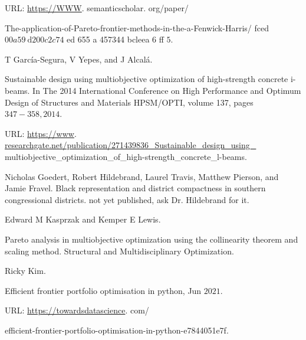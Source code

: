 URL: \href{https://WWW}{https://WWW}. semanticscholar. org/paper/

The-application-of-Pareto-frontier-methods-in-the-a-Fenwick-Harris/ fced $00 a 59 \mathrm{~d} 200 c 2 c 74$ ed 655 a 457344 bcleea 6 ff $5 .$

T García-Segura, V Yepes, and J Alcalá.

Sustainable design using multiobjective optimization of high-strength concrete i-beams. In The 2014 International Conference on High Performance and Optimum Design of Structures and Materials HPSM/OPTI, volume 137, pages $347-358,2014 .$

URL: \href{https://www}{https://www}. \href{http://researchgate.net/publication/271439836_Sustainable_design_using_}{researchgate.net/publication/271439836\_Sustainable\_design\_using\_} multiobjective\_optimization\_of\_high-strength\_concrete\_l-beams.

Nicholas Goedert, Robert Hildebrand, Laurel Travis, Matthew Pierson, and Jamie Fravel. Black representation and district compactness in southern congressional districts. not yet published, ask Dr. Hildebrand for it.

Edward M Kasprzak and Kemper E Lewis.

Pareto analysis in multiobjective optimization using the collinearity theorem and scaling method. Structural and Multidisciplinary Optimization.

Ricky Kim.

Efficient frontier portfolio optimisation in python, Jun $2021 .$

URL: \href{https://towardsdatascience}{https://towardsdatascience}. com/

efficient-frontier-portfolio-optimisation-in-python-e7844051e7f.


%